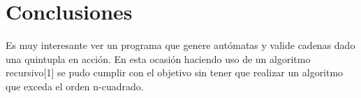\section{Conclusiones}

Es muy interesante ver un programa que genere autómatas y valide cadenas dado una quintupla en acción. En esta ocasión haciendo uso de un algoritmo recursivo[1] se pudo cumplir con el objetivo sin tener que realizar un algoritmo que exceda el orden n-cuadrado.

\pagebreak